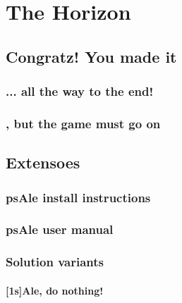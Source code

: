 \documentclass[12pt, a4paper]{book}
\begin{document}
\part[The Horizon]{The Horizon\\[2ex]
}

\chapter{Congratz! You made it}
\section{... all the way to the end!}
\section{, but the game must go on}
\chapter{Extensoes}
\section{psAle install instructions}
\section{psAle user manual}
\section{Solution variants}
\subsection{[1s]Ale, do nothing!}
\end{document}
